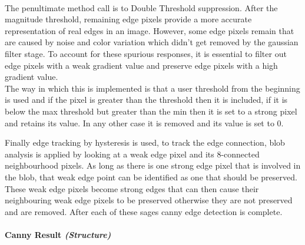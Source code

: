 \begin{FlushLeft}
\begin{itemize}
    \end{itemize}
    
    \\ \bk

    The penultimate method call is to Double Threshold suppression. After the magnitude threshold, remaining edge pixels provide a more accurate representation of real edges in an image. However, some edge pixels remain that are caused by noise and color variation which didn't get removed by the gaussian filter stage. To account for these spurious responses, it is essential to filter out edge pixels with a weak gradient value and preserve edge pixels with a high gradient value. \\

    The way in which this is implemented is that a user threshold from the beginning is used and if the pixel is greater than the threshold then it is included, if it is below the max threshold but greater than the min then it is set to a strong pixel and retains its value. In any other case it is removed and its value is set to 0. \\ \bk

    Finally edge tracking by hysteresis is used, to track the edge connection, blob analysis is applied by looking at a weak edge pixel and its 8-connected neighbourhood pixels. As long as there is one strong edge pixel that is involved in the blob, that weak edge point can be identified as one that should be preserved. These weak edge pixels become strong edges that can then cause their neighbouring weak edge pixels to be preserved otherwise they are not preserved and are removed. After each of these sages canny edge detection is complete. \\ \bk    
    \bk

    \pagebreak
    \paragraph{Canny Result \textit{(Structure)}} \mbox{} \\

    \begin{figure}[H]
        \centering
    \end{figure}\\


\end{FlushLeft}
